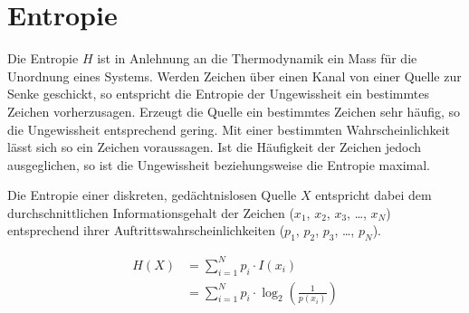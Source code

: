 \section{Entropie}

Die Entropie $H$ ist in Anlehnung an die Thermodynamik ein Mass für die Unordnung eines Systems. Werden Zeichen über einen Kanal von einer Quelle zur Senke geschickt, so entspricht die Entropie der Ungewissheit ein bestimmtes Zeichen vorherzusagen. Erzeugt die Quelle ein bestimmtes Zeichen sehr häufig, so die Ungewissheit entsprechend gering. Mit einer bestimmten Wahrscheinlichkeit lässt sich so ein Zeichen voraussagen. Ist die Häufigkeit der Zeichen jedoch ausgeglichen, so ist die Ungewissheit beziehungsweise die Entropie maximal. 

Die Entropie einer diskreten, gedächtnislosen Quelle $X$ entspricht dabei dem durchschnittlichen Informationsgehalt der Zeichen ($x_1$, $x_2$, $x_3$, \ldots, $x_N$) entsprechend ihrer Auftrittswahrscheinlichkeiten ($p_1$, $p_2$, $p_3$, \ldots, $p_N$). 

\begin{align*}
H(X)& =\sum\limits_{i=1}^N p_i \cdot I(x_i) \\
& =\sum\limits_{i=1}^N p_i \cdot \log_2\left(\frac{1}{p(x_i)}\right)
\end{align*}
